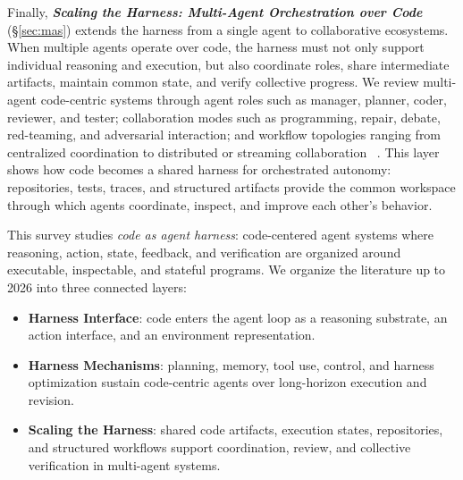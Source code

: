 Finally, \emph{\textbf{Scaling the Harness: Multi-Agent Orchestration over Code}} (\S\ref{sec:mas}) extends the harness from
a single agent to collaborative ecosystems.
When multiple agents operate over code, the harness must not only
support individual reasoning and execution, but also coordinate
roles, share intermediate artifacts, maintain common state, and
verify collective progress.
We review multi-agent code-centric systems through agent roles
such as manager, planner, coder, reviewer, and tester;
collaboration modes such as programming, repair, debate,
red-teaming, and adversarial interaction; and workflow topologies
ranging from centralized coordination to distributed or streaming
collaboration
~\cite{wu2024autogen,Hong2023MetaGPT,Dong2024SelfCollaboration}.
This layer shows how code becomes a shared harness for
orchestrated autonomy: repositories, tests, traces, and structured
artifacts provide the common workspace through which agents
coordinate, inspect, and improve each other's behavior.

\begin{tcolorbox}[
  agentscope,
  float,
  floatplacement=t
]
This survey studies \emph{code as agent harness}: code-centered agent systems where reasoning, action, state, feedback,
and verification are organized around executable, inspectable, and
stateful programs.
We organize the literature up to 2026 into three connected layers:
\begin{itemize}
    \item \textbf{Harness Interface}: code enters the agent loop
    as a reasoning substrate, an action interface, and an
    environment representation.

    \item \textbf{Harness Mechanisms}: planning, memory, tool use,
    control, and harness optimization sustain code-centric agents over
    long-horizon execution and revision.

    \item \textbf{Scaling the Harness}: shared code artifacts,
    execution states, repositories, and structured workflows
    support coordination, review, and collective verification in
    multi-agent systems.
\end{itemize}


\end{tcolorbox}

